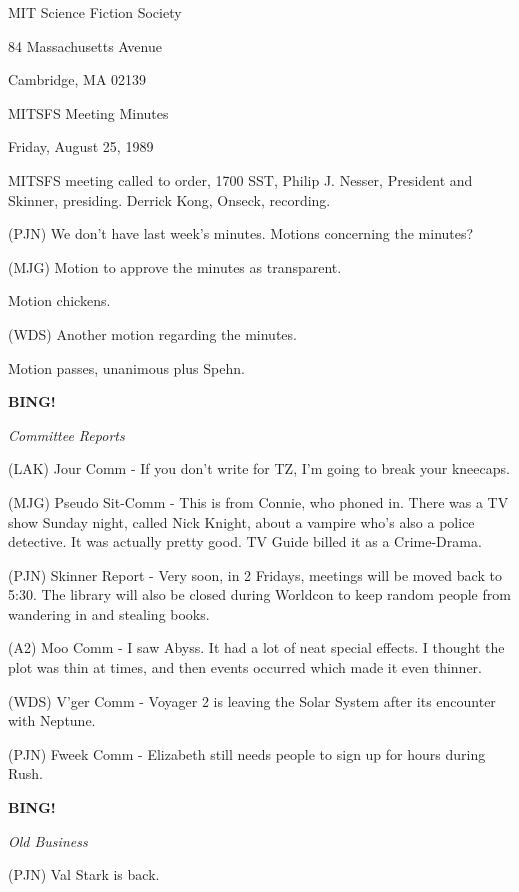 \documentclass[12pt]{article}
\newcommand{\bing}{{\bf BING!} }
\newcommand{\goto}[1]{\bing \vskip 12pt \centerline{{\em{#1}}}}
\begin{document}
\begin{center}

MIT Science Fiction Society 

84 Massachusetts Avenue

Cambridge, MA 02139

\vspace{12pt}

MITSFS Meeting Minutes 

Friday, August 25, 1989

\end{center}
 
\vspace{18pt}

\setlength{\parskip}{6pt}

\noindent
MITSFS meeting called to order, 1700 SST, Philip J. Nesser, President and Skinner, presiding. Derrick Kong, Onseck, recording.

(PJN) We don't have last week's minutes.  Motions concerning the minutes?

(MJG) Motion to approve the minutes as transparent.

Motion chickens.

(WDS) Another motion regarding the minutes.

Motion passes, unanimous plus Spehn.

\goto{Committee Reports}

(LAK) Jour Comm - If you don't write for TZ, I'm going to break your kneecaps.

(MJG) Pseudo Sit-Comm - This is from Connie, who phoned in.  There was a TV show Sunday night, called Nick Knight, about a vampire who's also a police detective. It was actually pretty good. TV Guide billed it as a Crime-Drama.

(PJN) Skinner Report - Very soon, in 2 Fridays, meetings will be moved back to 5:30.  The library will also be closed during Worldcon to keep random people from wandering in and stealing books.

(A2) Moo Comm - I saw Abyss. It had a lot of neat special effects.  I thought the plot was thin at times, and then events occurred which made it even thinner.

(WDS) V'ger Comm - Voyager 2 is leaving the Solar System after its encounter with Neptune.

(PJN) Fweek Comm - Elizabeth still needs people to sign up for hours during Rush.

\goto{Old Business}

(PJN) Val Stark is back.
\end{document}
